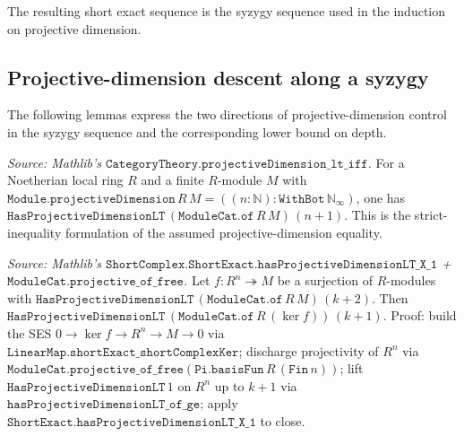 The resulting short exact sequence is the syzygy sequence used in the
induction on projective dimension.

\subsection{Projective-dimension descent along a syzygy}
\label{subsec:ab_gap1_haspdlt_pivot}

The following lemmas express the two directions of projective-dimension
control in the syzygy sequence and the corresponding lower bound on depth.
\begin{lemma}[Bridge: \(\texttt{projectiveDimension}\,M = n \Rightarrow \texttt{HasProjectiveDimensionLT}\,M\,(n+1)\)]\leanok
  \label{lem:hasProjectiveDimensionLT_succ_of_projectiveDimension_eq}
  \textit{Source: Mathlib's \(\texttt{CategoryTheory.projectiveDimension\_lt\_iff}\).}
  For a Noetherian local ring \(R\) and a finite \(R\)-module \(M\)
  with \(\texttt{Module.projectiveDimension}\,R\,M =
  ((n : \mathbb N) : \texttt{WithBot}\,\mathbb N_\infty)\), one has
  \(\texttt{HasProjectiveDimensionLT}\,(\texttt{ModuleCat.of}\,R\,M)\,
  (n+1)\). This is the strict-inequality formulation of the assumed
  projective-dimension equality.
\end{lemma}
\begin{lemma}\leanok
  \label{lem:hasProjectiveDimensionLT_ker_of_surjection}
  \textit{Source: Mathlib's
  \(\texttt{ShortComplex.ShortExact.hasProjectiveDimensionLT\_X\_1}\) +
  \(\texttt{ModuleCat.projective\_of\_free}\).}
  Let \(f : R^n \twoheadrightarrow M\) be a surjection of \(R\)-modules
  with \(\texttt{HasProjectiveDimensionLT}\,(\texttt{ModuleCat.of}\,R\,M)\,
  (k+2)\). Then
  \(\texttt{HasProjectiveDimensionLT}\,
   (\texttt{ModuleCat.of}\,R\,(\ker f))\,(k+1)\).
  Proof: build the SES \(0 \to \ker f \to R^n \to M \to 0\) via
  \(\texttt{LinearMap.shortExact\_shortComplexKer}\); discharge
  projectivity of \(R^n\) via \(\texttt{ModuleCat.projective\_of\_free}
   (\texttt{Pi.basisFun}\,R\,(\texttt{Fin}\,n))\); lift
  \(\texttt{HasProjectiveDimensionLT}\,1\) on \(R^n\) up to
  \(k+1\) via \(\texttt{hasProjectiveDimensionLT\_of\_ge}\); apply
  \(\texttt{ShortExact.hasProjectiveDimensionLT\_X\_1}\) to close.
\end{lemma}
